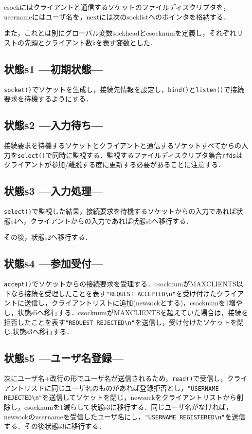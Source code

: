 \documentclass[a4j,10pt,titlepage]{jsarticle}
\begin{document}
csockにはクライアントと通信するソケットのファイルディスクリプタを，usernameにはユーザ名を，nextには次のsocklistへのポインタを格納する．

また，これとは別にグローバル変数sockheadとcsocknumを定義し，それぞれリストの先頭とクライアント数kを表す変数とした．

\subsection{状態s1 ---初期状態---}
\verb|socket()|でソケットを生成し，接続先情報を設定し，\verb|bind()|と\verb|listen()|で接続要求を待機するようにする．

\subsection{状態s2 ---入力待ち---}
接続要求を待機するソケットとクライアントと通信するソケットすべてからの入力を\verb|select()|で同時に監視する．監視するファイルディスクリプタ集合\verb|rfds|はクライアントが参加/離脱する度に更新する必要があることに注意する．

\subsection{状態s3 ---入力処理---}
\verb|select()|で監視した結果，接続要求を待機するソケットからの入力であれば状態s4へ，クライアントからの入力であれば状態s6へ移行する．

その後，状態s2へ移行する．

\subsection{状態s4 ---参加受付---}
\verb|accept()|でソケットからの接続要求を受理する．csocknumがMAXCLIENTS以下なら接続を受理したことを表す\verb|"REQUEST ACCEPTED\n"|を受け付けたクライアントに送信し，クライアントリストに追加(newsockとする)，csocknumを1増やし，状態s5へ移行する．csocknumがMAXCLIENTSを超えていた場合は，接続を拒否したことを表す\verb|"REQUEST REJECTED\n"|を送信し，受け付けたソケットを閉じ,状態s3へ移行する．

\subsection{状態s5 ---ユーザ名登録---}
次にユーザ名+改行の形でユーザ名が送信されるため，\verb|read()|で受信し，クライアントリストに同じユーザ名のものがあれば登録拒否とし，\verb|"USERNAME REJECTED\n"|を送信してソケットを閉じ，newsockをクライアントリストから削除し，csocknumを1減らして状態s3に移行する．同じユーザ名がなければ，newsockのusernameを受信したユーザ名にし，\verb|"USERNAME REGISTERED\n"|を送信する．その後状態s3に移行する．
\end{document}

